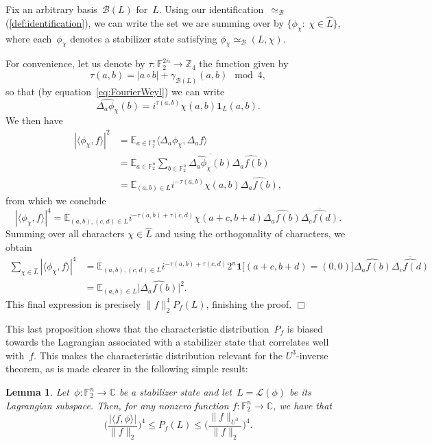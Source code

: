 \documentclass[11pt]{amsart}
\newcommand{\E}{\mathbb{E}}
\newcommand{\C}{\mathbb{C}} %
\newcommand{\Z}{\mathbb{Z}} %
\newcommand{\F}{\mathbb{F}} %
\newcommand{\Lcal}{\mathcal{L}}
\newcommand{\one}{\mathbf{1}}
\newcommand{\B}{\mathcal B}
\theoremstyle{plain}
\newtheorem{lemma}[theorem]{Lemma}
\theoremstyle{definition}
\theoremstyle{remark}
\renewenvironment{proof}[1][]{
    	\begin{trivlist}
     	\item[\hspace{\labelsep}{\em\noindent Proof#1:\/}]}
     	{{\hfill$\Box$}
    	\end{trivlist}
  }
\begin{document}
\begin{proof}
Fix an arbitrary basis~$\B(L)$ for~$L$.
Using our identification~$\simeq_\B$ (\cref{def:identification}), we can write the set we are summing over by $\{\phi_\chi:\: \chi\in \widehat{L}\}$, where each~$\phi_\chi$ denotes a stabilizer state satisfying $\phi_\chi \simeq_\B (L,\chi)$.

For convenience, let us denote by $\tau: \F_2^{2n} \to \Z_4$ the function given by
$$\tau(a,b) = |a\circ b| + \gamma_{\B(L)}(a,b) \mod 4,$$
so that (by equation~\eqref{eq:FourierWeyl}) we can write
$$\widehat{\Delta_a \phi_\chi}(b) = i^{\tau(a,b)} \chi(a,b) \one_L(a,b).$$
We then have
\begin{align*}
    |\langle \phi_\chi, f\rangle|^2
    &= \E_{a\in \F_2^n} \langle \Delta_a\phi_\chi, \Delta_af\rangle \\
    &= \E_{a\in \F_2^n} \sum_{b\in \F_2^n} \overline{\widehat{\Delta_a\phi_\chi}(b)} \widehat{\Delta_af(b)} \\
    &= \E_{(a,b) \in L} i^{-\tau(a,b)} \chi(a,b) \widehat{\Delta_af(b)},
\end{align*}
from which we conclude
$$|\langle \phi_\chi, f\rangle|^4 = \E_{(a,b), (c,d) \in L} i^{-\tau(a,b) +\tau(c,d)} \chi(a+c, b+d) \widehat{\Delta_af(b)} \overline{\widehat{\Delta_cf(d)}}.$$
Summing over all characters $\chi\in \widehat{L}$ and using the orthogonality of characters, we obtain
\begin{align*}
    \sum_{\chi\in \widehat{L}} |\langle \phi_\chi, f\rangle|^4
    &= \E_{(a,b), (c,d) \in L} i^{-\tau(a,b) +\tau(c,d)} 2^n \one\big[(a+c, b+d)=(0,0)\big] \widehat{\Delta_af(b)} \overline{\widehat{\Delta_cf(d)}} \\
    &= \E_{(a,b) \in L} \big|\widehat{\Delta_af(b)}\big|^2.
\end{align*}
This final expression is precisely $\|f\|_2^4 P_f(L)$, finishing the proof.
\end{proof}

This last proposition shows that the characteristic distribution~$P_f$ is biased towards the Lagrangian associated with a stabilizer state that correlates well with~$f$.
This makes the characteristic distribution relevant for the $U^3$-inverse theorem, as is made clearer in the following simple result:

\begin{lemma} \label{lem:Lcorr}
Let~$\phi:\F_2^n\to\C$ be a stabilizer state and let~$L = \Lcal(\phi)$ be its Lagrangian subspace.
Then, for any nonzero function $f:\F_2^n\to \C$, we have that
\begin{equation*}
    \bigg(\frac{|\langle f, \phi\rangle|}{\|f\|_2}\bigg)^4
    \leq
    P_f(L)
    \leq 
    \bigg(\frac{\|f\|_{U^3}}{\|f\|_2}\bigg)^4.
\end{equation*}
\end{lemma}
\end{document}
